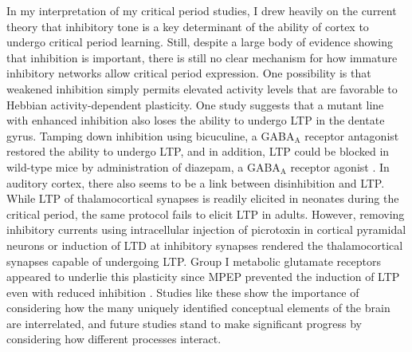 In my interpretation of my critical period studies, I drew heavily on the current theory that inhibitory tone is a key determinant of the ability of cortex to undergo critical period learning. Still, despite a large body of evidence showing that inhibition is important, there is still no clear mechanism for how immature inhibitory networks allow critical period expression. One possibility is that weakened inhibition simply permits elevated activity levels that are favorable to Hebbian activity-dependent plasticity. One study suggests that a mutant line with enhanced inhibition also loses the ability to undergo LTP in the dentate gyrus. Tamping down inhibition using bicuculine, a GABA$_\mathrm{A}$ receptor antagonist restored the ability to undergo LTP, and in addition, LTP could be blocked in wild-type mice by administration of diazepam, a GABA$_\mathrm{A}$ receptor agonist \cite{Levkovitz1999}. In auditory cortex, there also seems to be a link between disinhibition and LTP. While LTP of thalamocortical synapses is readily elicited in neonates during the critical period, the same protocol fails to elicit LTP in adults. However, removing inhibitory currents using intracellular injection of picrotoxin in cortical pyramidal neurons or induction of LTD at inhibitory synapses rendered the thalamocortical synapses capable of undergoing LTP. Group I metabolic glutamate receptors appeared to underlie this plasticity since MPEP prevented the induction of LTP even with reduced inhibition \cite{Chun2013}. Studies like these show the importance of considering how the many uniquely identified conceptual elements of the brain are interrelated, and future studies stand to make significant progress by considering how different processes interact.